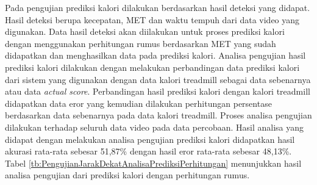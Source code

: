 Pada pengujian prediksi kalori dilakukan berdasarkan hasil deteksi yang didapat. Hasil deteksi berupa kecepatan, MET dan waktu tempuh dari data video yang digunakan. Data hasil deteksi akan diilakukan untuk proses prediksi kalori dengan menggunakan perhitungan rumus berdasarkan MET yang sudah didapatkan dan menghasilkan data pada prediksi kalori. Analisa pengujian hasil prediksi kalori dilakukan dengan melakukan perbandingan data prediksi kalori dari sistem yang digunakan dengan data kalori treadmill sebagai data sebenarnya atau data \emph{actual score}. Perbandingan hasil prediksi kalori dengan kalori treadmill didapatkan data eror yang kemudian dilakukan perhitungan persentase berdasarkan data sebenarnya pada data kalori treadmill. Proses analisa pengujian dilakukan terhadap seluruh data video pada data percobaan. Hasil analisa yang didapat dengan melakukan analisa pengujian prediksi kalori didapatkan hasil akurasi rata-rata sebesar 51,87\% dengan hasil eror rata-rata sebesar 48,13\%. Tabel \ref{tb:PengujianJarakDekatAnalisaPrediksiPerhitungan} menunjukkan hasil analisa pengujian dari prediksi kalori dengan perhitungan rumus.

